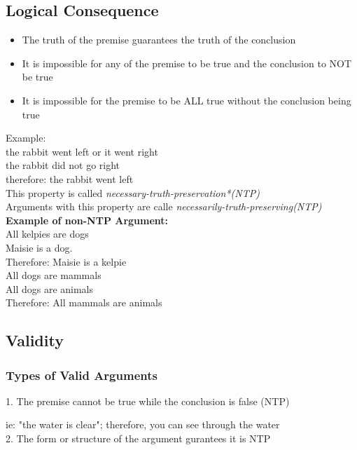 \documentclass[]{article}
\begin{document}
\subsection{Logical Consequence}
\begin{itemize}
	\item{The truth of the premise guarantees the truth of the conclusion}
	\item{It is impossible for any of the premise to be true and the conclusion to NOT be true}
	\item{It is impossible for the premise to be ALL true without the conclusion being true}
\end{itemize}
Example:\\
the rabbit went left or it went right\\
the rabbit did not go right\\
therefore: the rabbit went left\vspace{5pt}\\
This property is called \textit{necessary-truth-preservation*(NTP)}\\
Arguments with this property are calle \textit{necessarily-truth-preserving(NTP)}\vspace{5pt}\\
\textbf{Example of non-NTP Argument:}\vspace{5pt}\\
All kelpies are dogs\\
Maisie is a dog.\\
Therefore: Maisie is a kelpie\vspace{5pt}\\
All dogs are mammals\\ 
All dogs are animals\\
Therefore: All mammals are animals\\
\subsection{Validity}
\subsubsection{Types of Valid Arguments}
1. The premise cannot be true while the conclusion is false (NTP)

ie: "the water is clear"; therefore, you can see through the water
\vspace{5pt}\\
2. The form or structure of the argument gurantees it is NTP
\end{document}

